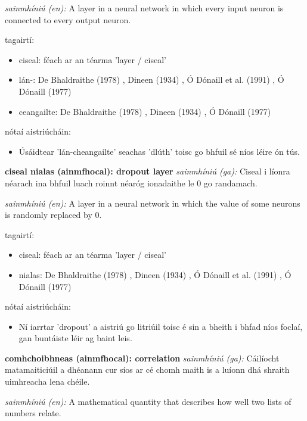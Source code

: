 \documentclass{article}
\begin{document}
\textit{sainmhíniú (en):} A layer in a neural network in which every input neuron is connected to every output neuron.

tagairtí:
\begin{itemize}
	\item ciseal: féach ar an téarma 'layer / ciseal'
	\item lán-: De Bhaldraithe (1978) \cite{de-bhaldraithe}, Dineen (1934) \cite{dineen}, Ó Dónaill et al. (1991) \cite{focloir-beag}, Ó Dónaill (1977) \cite{odonaill}
	\item ceangailte: De Bhaldraithe (1978) \cite{de-bhaldraithe}, Dineen (1934) \cite{dineen}, Ó Dónaill (1977) \cite{odonaill}
\end{itemize}

nótaí aistriúcháin:
\begin{itemize}
	\item Úsáidtear 'lán-cheangailte' seachas 'dlúth' toisc go bhfuil sé níos léire ón tús.
\end{itemize}


\textbf{ciseal nialas (ainmfhocal): dropout layer}
\textit{sainmhíniú (ga):} Ciseal i líonra néarach ina bhfuil luach roinnt néaróg ionadaithe le 0 go randamach.

\textit{sainmhíniú (en):} A layer in a neural network in which the value of some neurons is randomly replaced by 0.

tagairtí:
\begin{itemize}
	\item ciseal: féach ar an téarma 'layer / ciseal'
	\item nialas: De Bhaldraithe (1978) \cite{de-bhaldraithe}, Dineen (1934) \cite{dineen}, Ó Dónaill et al. (1991) \cite{focloir-beag}, Ó Dónaill (1977) \cite{odonaill}
\end{itemize}

nótaí aistriúcháin:
\begin{itemize}
	\item Ní iarrtar 'dropout' a aistriú go litriúil toisc é sin a bheith i bhfad níos foclaí, gan buntáiste léir ag baint leis.
\end{itemize}


\textbf{comhchoibhneas (ainmfhocal): correlation}
\textit{sainmhíniú (ga):} Cáilíocht matamaiticiúil a dhéanann cur síos ar cé chomh maith is a luíonn dhá shraith uimhreacha lena chéile.

\textit{sainmhíniú (en):} A mathematical quantity that describes how well two lists of numbers relate.
\end{document}
